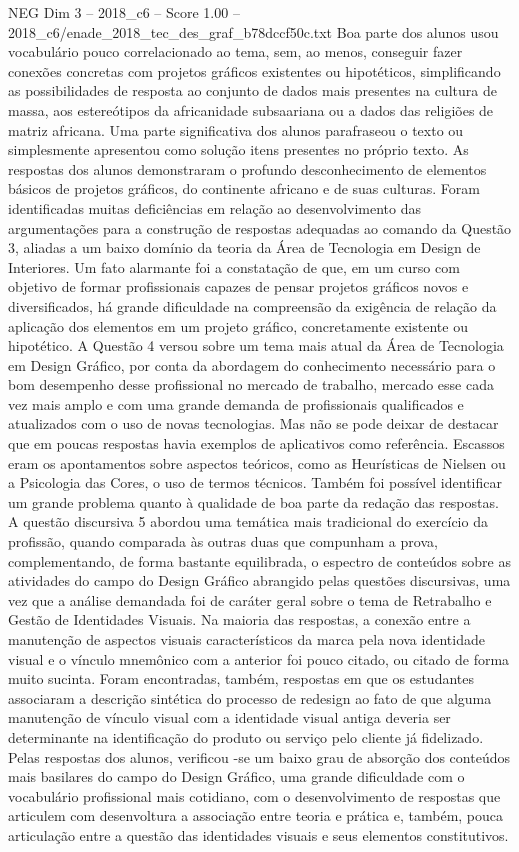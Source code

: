 \begin{textsample}{NEG Dim 3 – 2018\_c6 – Score 1.00 – 2018\_c6/enade\_2018\_tec\_des\_graf\_b78dccf50c.txt}
Boa parte dos alunos usou vocabulário pouco correlacionado ao tema, sem, ao menos, conseguir fazer conexões concretas com projetos gráficos existentes ou hipotéticos, simplificando as possibilidades de resposta ao conjunto de dados mais presentes na cultura de massa, aos estereótipos da africanidade subsaariana ou a dados das religiões de matriz africana.
Uma parte significativa dos alunos parafraseou o texto ou simplesmente apresentou como solução itens presentes no próprio texto.
As respostas dos alunos demonstraram o profundo desconhecimento de elementos básicos de projetos gráficos, do continente africano e de suas culturas.
Foram identificadas muitas deficiências em relação ao desenvolvimento das argumentações para a construção de respostas adequadas ao comando da Questão 3, aliadas a um baixo domínio da teoria da Área de Tecnologia em Design de Interiores.
Um fato alarmante foi a constatação de que, em um curso com objetivo de formar profissionais capazes de pensar projetos gráficos novos e diversificados, há grande dificuldade na compreensão da exigência de relação da aplicação dos elementos em um projeto gráfico, concretamente existente ou hipotético.
A Questão 4 versou sobre um tema mais atual da Área de Tecnologia em Design Gráfico, por conta da abordagem do conhecimento necessário para o bom desempenho desse profissional no mercado de trabalho, mercado esse cada vez mais amplo e com uma grande demanda de profissionais qualificados e atualizados com o uso de novas tecnologias.
Mas não se pode deixar de destacar que em poucas respostas havia exemplos de aplicativos como referência.
Escassos eram os apontamentos sobre aspectos teóricos, como as Heurísticas de Nielsen ou a Psicologia das Cores, o uso de termos técnicos.
Também foi possível identificar um grande problema quanto à qualidade de boa parte da redação das respostas.
A questão discursiva 5 abordou uma temática mais tradicional do exercício da profissão, quando comparada às outras duas que compunham a prova, complementando, de forma bastante equilibrada, o espectro de conteúdos sobre as atividades do campo do Design Gráfico abrangido pelas questões discursivas, uma vez que a análise demandada foi de caráter geral sobre o tema de Retrabalho e Gestão de Identidades Visuais.
Na maioria das respostas, a conexão entre a manutenção de aspectos visuais característicos da marca pela nova identidade visual e o vínculo mnemônico com a anterior foi pouco citado, ou citado de forma muito sucinta.
Foram encontradas, também, respostas em que os estudantes associaram a descrição sintética do processo de redesign ao fato de que alguma manutenção de vínculo visual com a identidade visual antiga deveria ser determinante na identificação do produto ou serviço pelo cliente já fidelizado.
Pelas respostas dos alunos, verificou -se um baixo grau de absorção dos conteúdos mais basilares do campo do Design Gráfico, uma grande dificuldade com o vocabulário profissional mais cotidiano, com o desenvolvimento de respostas que articulem com desenvoltura a associação entre teoria e prática e, também, pouca articulação entre a questão das identidades visuais e seus elementos constitutivos.

\end{textsample}
